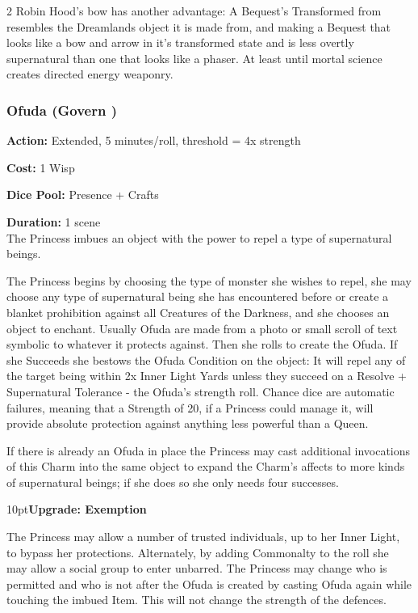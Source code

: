 \begin{multicols}{2}
Robin Hood's bow has another advantage: A Bequest's Transformed from resembles the Dreamlands object it is made from, and making a Bequest that looks like a bow and arrow in it's transformed state and is less overtly supernatural than one that looks like a phaser. At least until mortal science creates directed energy weaponry. 
\bigsidebarend

\subsubsection*{Ofuda (Govern \textbullet\textbullet\textbullet)}

\noindent \textbf{Action:} Extended, 5 minutes/roll, threshold = 4x strength

\noindent \textbf{Cost:} 1 Wisp

\noindent \textbf{Dice Pool:} Presence + Crafts

\noindent \textbf{Duration:} 1 scene \\

\noindent The Princess imbues an object with the power to repel a type of supernatural beings.

The Princess begins by choosing the type of monster she wishes to repel, she may choose any type of supernatural being she has encountered before or create a blanket prohibition against all Creatures of the Darkness, and she chooses an object to enchant. Usually Ofuda are made from a photo or small scroll of text symbolic to whatever it protects against. Then she rolls to create the Ofuda. If she Succeeds she bestows the Ofuda Condition on the object: It will repel any of the target being within 2x Inner Light Yards unless they succeed on a Resolve + Supernatural Tolerance - the Ofuda’s strength roll. Chance dice are automatic failures, meaning that a Strength of 20, if a Princess could manage it, will provide absolute protection against anything less powerful than a Queen.  

If there is already an Ofuda in place the Princess may cast additional invocations of this Charm into the same object to expand the Charm's affects to more kinds of supernatural beings; if she does so she only needs four successes.

\begin{myindentpar}{10pt}\textbf{Upgrade: Exemption}

The Princess may allow a number of trusted individuals, up to her Inner Light, to bypass her protections. Alternately, by adding Commonalty to the roll she may allow a social group to enter unbarred. The Princess may change who is permitted and who is not after the Ofuda is created by casting Ofuda again while touching the imbued Item. This will not change the strength of the defences.


\end{myindentpar}
\end{multicols}
